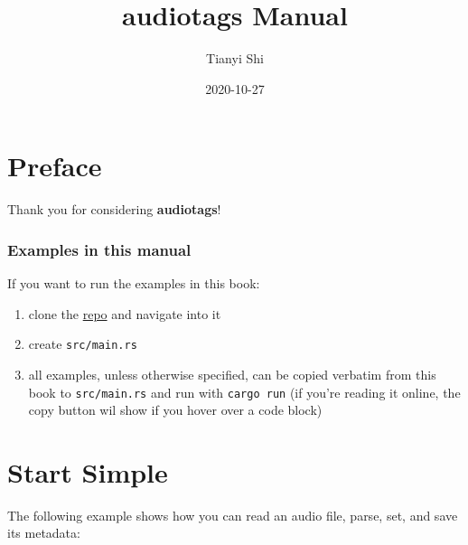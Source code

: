 \documentclass[
]{book}
\title{audiotags Manual}
\author{Tianyi Shi}
\date{2020-10-27}
\providecommand{\tightlist}{%
  \setlength{\itemsep}{0pt}\setlength{\parskip}{0pt}}
\begin{document}
\maketitle

{
\setcounter{tocdepth}{1}
\tableofcontents
}
\hypertarget{preface}{%
\chapter*{Preface}\label{preface}}

Thank you for considering \textbf{audiotags}!

\hypertarget{examples-in-this-manual}{%
\subsection*{Examples in this manual}\label{examples-in-this-manual}}

If you want to run the examples in this book:

\begin{enumerate}
\def\labelenumi{\arabic{enumi}.}
\tightlist
\item
  clone the \href{https://github.com/TianyiShi2001/audiotags}{repo} and navigate into it
\item
  create \texttt{src/main.rs}
\item
  all examples, unless otherwise specified, can be copied verbatim from this book to \texttt{src/main.rs} and run with \texttt{cargo\ run} (if you're reading it online, the copy button wil show if you hover over a code block)
\end{enumerate}

\hypertarget{start-simple}{%
\chapter{Start Simple}\label{start-simple}}

The following example shows how you can read an audio file, parse, set, and save its metadata:
\end{document}
